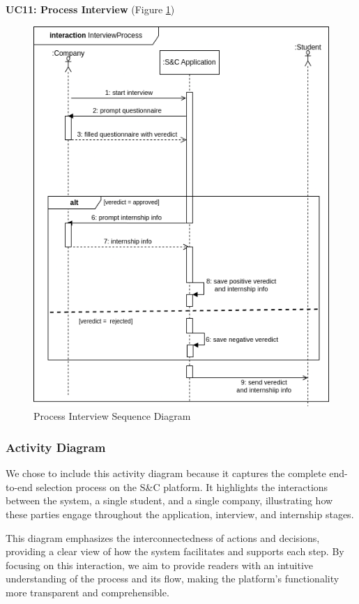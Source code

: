 \textbf{UC11: Process Interview} (Figure \ref{fig:process_sequence})
\begin{figure}[H]
\centering
\includegraphics[width=\textwidth]{Images/interviewProcess-sequence.png}
\caption{\label{fig:process_sequence} Process Interview Sequence Diagram}
\end{figure}

\subsubsection{Activity Diagram}
We chose to include this activity diagram because it captures the complete end-to-end selection process on the S\&C platform. It highlights the interactions between the system, a single student, and a single company, illustrating how these parties engage throughout the application, interview, and internship stages.

This diagram emphasizes the interconnectedness of actions and decisions, providing a clear view of how the system facilitates and supports each step. By focusing on this interaction, we aim to provide readers with an intuitive understanding of the process and its flow, making the platform's functionality more transparent and comprehensible.

